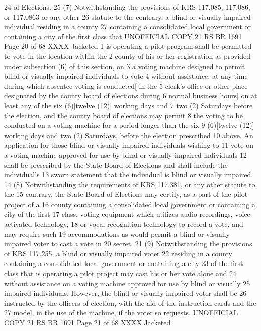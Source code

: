 24 of Elections.
25 (7) Notwithstanding the provisions of KRS 117.085, 117.086, or 117.0863 or any other
26 statute to the contrary, a blind or visually impaired individual residing in a county
27 containing a consolidated local government or containing a city of the first class that 
UNOFFICIAL COPY 21 RS BR 1691
Page 20 of 68
XXXX Jacketed
1 is operating a pilot program shall be permitted to vote in the location within the
2 county of his or her registration as provided under subsection (6) of this section, on
3 a voting machine designed to permit blind or visually impaired individuals to vote
4 without assistance, at any time during which absentee voting is conducted[ in the
5 clerk's office or other place designated by the county board of elections during
6 normal business hours] on at least any of the six (6)[twelve (12)] working days and
7 two (2) Saturdays before the election, and the county board of elections may permit
8 the voting to be conducted on a voting machine for a period longer than the six
9 (6)[twelve (12)] working days and two (2) Saturdays, before the election prescribed
10 above. An application for those blind or visually impaired individuals wishing to
11 vote on a voting machine approved for use by blind or visually impaired individuals
12 shall be prescribed by the State Board of Elections and shall include the individual's
13 sworn statement that the individual is blind or visually impaired.
14 (8) Notwithstanding the requirements of KRS 117.381, or any other statute to the
15 contrary, the State Board of Elections may certify, as a part of the pilot project of a
16 county containing a consolidated local government or containing a city of the first
17 class, voting equipment which utilizes audio recordings, voice-activated technology,
18 or vocal recognition technology to record a vote, and may require such
19 accommodations as would permit a blind or visually impaired voter to cast a vote in
20 secret.
21 (9) Notwithstanding the provisions of KRS 117.255, a blind or visually impaired voter
22 residing in a county containing a consolidated local government or containing a city
23 of the first class that is operating a pilot project may cast his or her vote alone and
24 without assistance on a voting machine approved for use by blind or visually
25 impaired individuals. However, the blind or visually impaired voter shall be
26 instructed by the officers of election, with the aid of the instruction cards and the
27 model, in the use of the machine, if the voter so requests.
UNOFFICIAL COPY 21 RS BR 1691
Page 21 of 68
XXXX Jacketed
